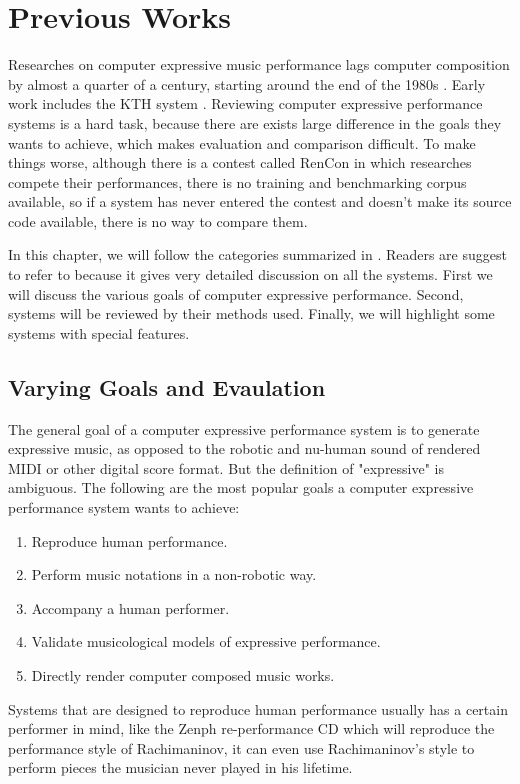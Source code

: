 \chapter{Previous Works}
Researches on computer expressive music performance lags computer composition by almost a quarter of a century, starting around the end of the 1980s \cite{THEBOOK}. Early work includes the KTH system \cite{THEBOOK}. Reviewing computer expressive performance systems is a hard task, because there are exists large difference in the goals they wants to achieve, which makes evaluation and comparison difficult. To make things worse, although there is a contest called RenCon \cite{RenCon} in which researches compete their performances, there is no training and benchmarking corpus available, so if a system has never entered the contest and doesn't make its source code available, there is no way to compare them.

In this chapter, we will follow the categories summarized in \cite{THEBOOK}. Readers are suggest to refer to \cite{THEBOOK} because it gives very detailed discussion on all the systems. First we will discuss the various goals of computer expressive performance. Second, systems will be reviewed by their methods used. Finally, we will highlight some systems with special features.

\section{Varying Goals and Evaulation}
The general goal of a computer expressive performance system is to generate expressive music, as opposed to the robotic and nu-human sound of rendered MIDI or other digital score format. But the definition of "expressive" is ambiguous. The following are the most popular goals a computer expressive performance system wants to achieve:
\begin{enumerate}
   \item Reproduce human performance.
   \item Perform music notations in a non-robotic way.
   \item Accompany a human performer.
   \item Validate musicological models of expressive performance.
   \item Directly render computer composed music works.
\end{enumerate}

Systems that are designed to reproduce human performance usually has a certain performer in mind, like the Zenph re-performance CD \cite{zenph} which will reproduce the performance style of Rachimaninov, it can even use Rachimaninov's style to perform pieces the musician never played in his lifetime. 


